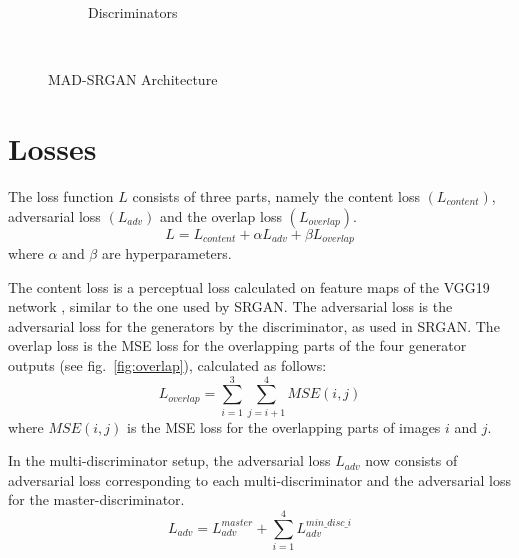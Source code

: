 \documentclass[12pt,a4paper,twocolumn]{article}
\begin{document}
\begin{figure}
\begin{subfigure}{0.4\textwidth}
                \caption{Discriminators}
            \end{subfigure}\\[3mm]
            \caption{MAD-SRGAN Architecture}
            \label{fig:gen-arch}
        \end{figure}

    \section{Losses}
        The loss function $L$ consists of three parts, namely the content loss $(L_{content})$, adversarial loss $(L_{adv})$ and the overlap loss $(L_{overlap})$.
            $$L = L_{content} + \alpha L_{adv} + \beta L_{overlap}$$
        where $\alpha$ and $\beta$ are hyperparameters.

        The content loss is a perceptual loss \cite{perceptual} calculated on feature maps of the VGG19 network \cite{vgg}, similar to the one used by SRGAN.
        The adversarial loss is the adversarial loss for the generators by the discriminator, as used in SRGAN.
        The overlap loss is the MSE loss for the overlapping parts of the four generator outputs (see fig.~\ref{fig:overlap}), calculated as follows:
            $$L_{overlap} = \sum_{i=1}^3 \sum_{j=i+1}^4 MSE(i, j)$$
        where $MSE(i, j)$ is the MSE loss for the overlapping parts of images $i$ and $j$.

        In the multi-discriminator setup, the adversarial loss $L_{adv}$ now consists of adversarial loss corresponding to each multi-discriminator and the adversarial loss for the master-discriminator.
            $$L_{adv} = L_{adv}^{master} + \sum_{i=1}^{4}L_{adv}^{min\_disc\_i}$$
\end{document}
